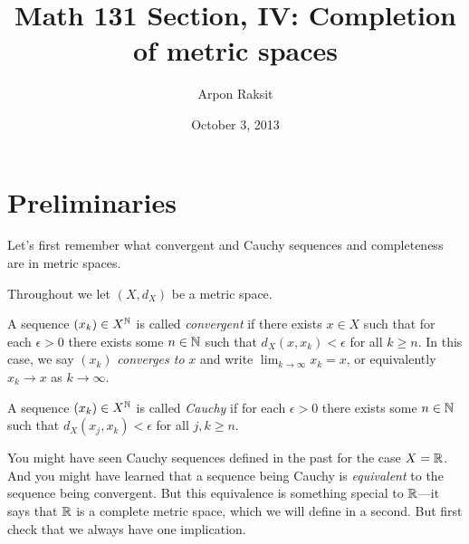 



\title{Math 131 Section, IV: Completion of metric spaces}
\author{Arpon Raksit}
\date{October 3, 2013}


\maketitle
\thispagestyle{fancy}


\section{Preliminaries}

Let's first remember what convergent and Cauchy sequences and
completeness are in metric spaces.

\begin{notation}
  Throughout we let $(X,d_X)$ be a metric space.
\end{notation}

\begin{definition}
  A sequence $(x_k) \in X^{\mathbb{N}}$ is called \textit{convergent} if there
  exists $x \in X$ such that for each $\epsilon > 0$ there exists some
  $n \in \mathbb{N}$ such that $d_X(x,x_k) < \epsilon$ for all $k \ge n$. In
  this case, we say $(x_k)$ \textit{converges to} $x$ and write
  $\lim_{k \to \infty} x_k = x$, or equivalently $x_k \to x$ as $k \to
  \infty$.
\end{definition}

\begin{definition}
  A sequence $(x_k) \in X^{\mathbb{N}}$ is called \textit{Cauchy} if for each
  $\epsilon > 0$ there exists some $n \in \mathbb{N}$ such that $d_X(x_j,x_k)
  < \epsilon$ for all $j,k \ge n$.
\end{definition}

\begin{nothing}
  You might have seen Cauchy sequences defined in the past for the
  case $X = \mathbb{R}$. And you might have learned that a sequence being
  Cauchy is \textit{equivalent} to the sequence being convergent. But
  this equivalence is something special to $\mathbb{R}$---it says that $\mathbb{R}$ is
  a complete metric space, which we will define in a second. But first
  check that we always have one implication.
\end{nothing}

